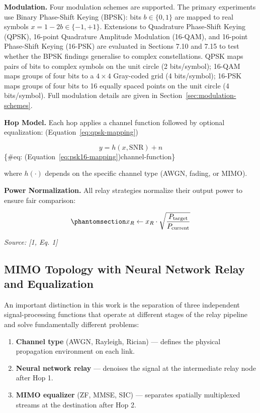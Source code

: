 \textbf{Modulation.} Four modulation schemes are supported. The primary experiments use Binary Phase-Shift Keying (BPSK): bits \(b \in \{0, 1\}\) are mapped to real symbols \(x = 1 - 2b \in \{-1, +1\}\). Extensions to Quadrature Phase-Shift Keying (QPSK), 16-point Quadrature Amplitude Modulation (16-QAM), and 16-point Phase-Shift Keying (16-PSK) are evaluated in Sections 7.10 and 7.15 to test whether the BPSK findings generalise to complex constellations. QPSK maps pairs of bits to complex symbols on the unit circle (2 bits/symbol); 16-QAM maps groups of four bits to a \(4 \times 4\) Gray-coded grid (4 bits/symbol); 16-PSK maps groups of four bits to 16 equally spaced points on the unit circle (4 bits/symbol). Full modulation details are given in Section~\ref{sec:modulation-schemes}.

\textbf{Hop Model.} Each hop applies a channel function followed by optional equalization: (Equation~\ref{eq:qpsk-mapping})

\[y = h(x, \text{SNR}) + n
\] \{\#eq: (Equation~\ref{eq:psk16-mapping})channel-function\}

where \(h(\cdot)\) depends on the specific channel type (AWGN, fading, or MIMO).

\textbf{Power Normalization.} All relay strategies normalize their output power to ensure fair comparison:

\begin{equation}\protect\phantomsection\label{eq:power-normalization}{x_R \leftarrow x_R \cdot \sqrt{\frac{P_{\text{target}}}{P_{\text{current}}}}
}\end{equation} \par{\small\textit{Source: [1, Eq. 1]}}

\subsection{MIMO Topology with Neural Network Relay and Equalization}\label{sec:mimo-topology-with-neural-network-relay-and-equalization}

An important distinction in this work is the separation of three independent signal-processing functions that operate at different stages of the relay pipeline and solve fundamentally different problems:

\begin{enumerate}
\def\labelenumi{\arabic{enumi}.}
\tightlist
\item
  \textbf{Channel type} (AWGN, Rayleigh, Rician) --- defines the physical propagation environment on each link.
\item
  \textbf{Neural network relay} --- denoises the signal at the intermediate relay node after Hop 1.
\item
  \textbf{MIMO equalizer} (ZF, MMSE, SIC) --- separates spatially multiplexed streams at the destination after Hop 2.
\end{enumerate}

